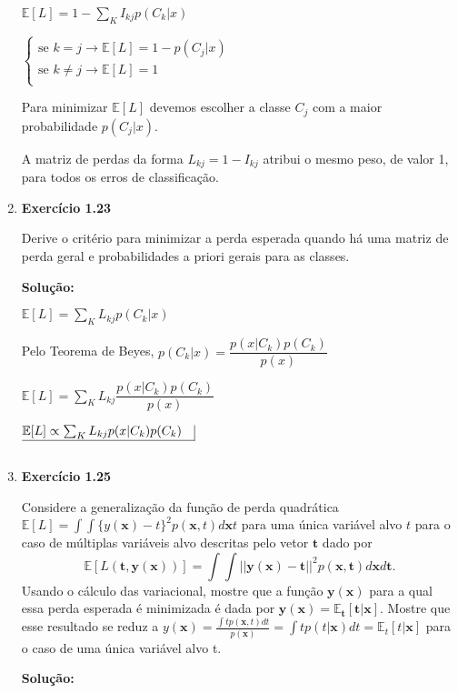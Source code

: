 \begin{enumerate}
$\mathbb{E}[L]=1 - \sum_{K}I_{kj}p(C_k | x)$

$\begin{cases}
    \text{se }k=j \rightarrow \mathbb{E}[L]=1 - p(C_j | x)\\
    \text{se }k\neq j \rightarrow \mathbb{E}[L]=1 \\
\end{cases}$


Para minimizar $\mathbb{E}[L]$ devemos escolher a classe $C_j$ com a maior probabilidade $p(C_j|x)$.

A matriz de perdas da forma $L_{kj} = 1 - I_{kj}$ atribui o mesmo peso, de valor 1, para todos os erros de classificação.\\

\item \textbf{Exercício 1.23} \par

Derive o critério para minimizar a perda esperada quando há uma matriz de perda geral e probabilidades a priori gerais para as classes.
\newline \par
\textbf{Solução:}

$\mathbb{E}[L]=\sum_{K}L_{kj}p(C_k | x)$

Pelo Teorema de Beyes, $p(C_k|x)=\dfrac{p(x|C_k)p(C_k)}{p(x)}$

$\mathbb{E}[L]=\sum_{K}L_{kj}\dfrac{p(x|C_k)p(C_k)}{p(x)}$

$\underline{\mathbb{E}[L] \propto \sum_{K}L_{kj}p(x|C_k)p(C_k) \quad}\vline $

$ $

\item \textbf{Exercício 1.25} \par

Considere a generalização da função de perda quadrática $\mathbb{E}[L] = \int \int \{y(\boldsymbol{x})-t\}^2p(\boldsymbol{x},t)d\boldsymbol{x}t$ para uma única variável alvo $t$ para o caso de múltiplas variáveis alvo descritas pelo vetor $\boldsymbol{t}$ dado por
\begin{equation*}
    \mathbb{E}[L(\boldsymbol{t},\boldsymbol{y}(\boldsymbol{x}))] = \int \int ||\boldsymbol{y}(\boldsymbol{x})-\boldsymbol{t}||^2p(\boldsymbol{x},\boldsymbol{t})d\boldsymbol{x}d\boldsymbol{t}.
\end{equation*}
Usando o cálculo das variacional, mostre que a função $\boldsymbol{y}(\boldsymbol{x})$ para a qual essa perda esperada é minimizada é dada por $\boldsymbol{y}(\boldsymbol{x}) = \mathbb{E}_{\boldsymbol{t}}[\boldsymbol{t}|\boldsymbol{x}]$. Mostre que esse resultado se reduz a $y(\boldsymbol{x}) = \frac{\int tp(\boldsymbol{x},t)dt}{p(\boldsymbol{x})} = \int tp(t|\boldsymbol{x}) dt = \mathbb{E}_t[t|\boldsymbol{x}]$ para o caso de uma única variável alvo t.
\newline \par
\textbf{Solução:}


\end{enumerate}
